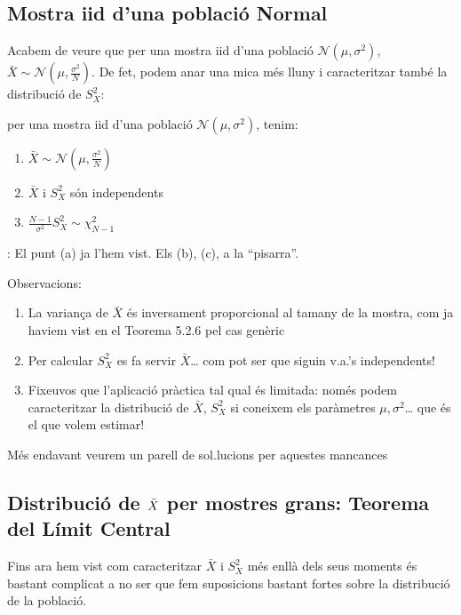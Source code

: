 \documentclass[letterpaper,10pt,english]{sphinxmanual}
\begin{document}
\subsection{Mostra iid d’una població Normal}
\label{\detokenize{0_Intro/0_2_Intro_stats:mostra-iid-d-una-poblacio-normal}}
Acabem de veure que per una mostra iid d’una població \(\mathcal{N}(\mu, \sigma^2)\),
\(\bar{X} \sim \mathcal{N}(\mu, \frac{\sigma^2}{N})\). De fet, podem anar una mica més lluny
i caracteritzar també la distribució de \(S_X^2\):

 per una mostra iid d’una població \(\mathcal{N}(\mu, \sigma^2)\), tenim:
\begin{enumerate}
%
\item {} 
\(\bar{X} \sim \mathcal{N}(\mu, \frac{\sigma^2}{N})\)

\item {} 
\(\bar{X}\) i  \(S_X^2\) són independents

\item {} 
\(\frac{N-1}{\sigma^2}S_X^2 \sim \chi^2_{N-1}\)

\end{enumerate}

: El punt (a) ja l’hem vist. Els (b), (c), a la “pisarra”.

Observacions:
\begin{enumerate}
%
\item {} 
La variança de \(\bar{X}\) és inversament proporcional al tamany de la mostra, com ja haviem vist en el Teorema 5.2.6 pel cas genèric

\item {} 
Per calcular \(S_X^2\) es fa servir \(\bar{X}\)… com pot ser que siguin v.a.’s independents!

\item {} 
Fixeu\sphinxhyphen{}vos que l’aplicació pràctica tal qual és limitada: només podem caracteritzar la distribució de \(\bar{X}\), \(S_X^2\) si coneixem els paràmetres  \(\mu, \sigma^2\)… que és el que volem estimar!

\end{enumerate}

Més endavant veurem un parell de sol.lucions per aquestes mancances


\subsection{Distribució de \protect\(\bar{X}\protect\) per mostres grans: Teorema del Límit Central}
\label{\detokenize{0_Intro/0_2_Intro_stats:distribucio-de-bar-x-per-mostres-grans-teorema-del-limit-central}}
Fins ara hem vist com caracteritzar \(\bar{X}\) i \(S_X^2\) més enllà dels seus moments
és bastant complicat a no ser que fem suposicions bastant fortes sobre
la distribució de la població.
\end{document}
